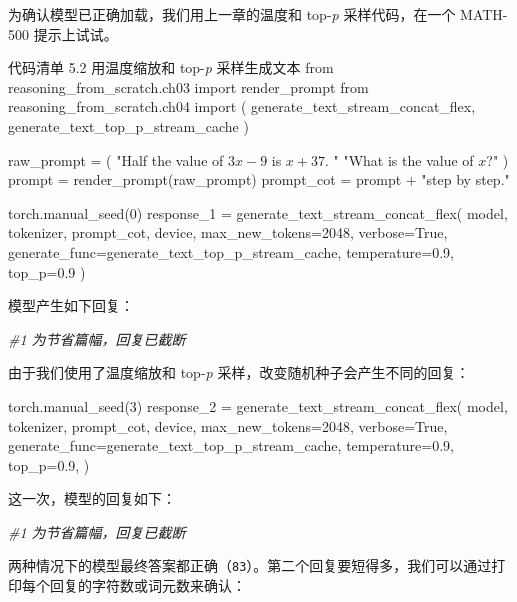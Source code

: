 为确认模型已正确加载，我们用上一章的温度和 top-\emph{p} 采样代码，在一个 MATH-500 提示上试试。

\begin{codeboxt}{代码清单 5.2 用温度缩放和 top-\emph{p} 采样生成文本}
from reasoning_from_scratch.ch03 import render_prompt
from reasoning_from_scratch.ch04 import (
    generate_text_stream_concat_flex,
    generate_text_top_p_stream_cache
)

raw_prompt = (
    "Half the value of $3x-9$ is $x+37$. "
    "What is the value of $x$?"
)
prompt = render_prompt(raw_prompt)
prompt_cot = prompt + "\n\nExplain step by step."

torch.manual_seed(0)
response_1 = generate_text_stream_concat_flex(
    model, tokenizer, prompt_cot, device,
    max_new_tokens=2048, verbose=True,
    generate_func=generate_text_top_p_stream_cache,
    temperature=0.9,
    top_p=0.9
)
\end{codeboxt}

模型产生如下回复：

{\noindent\small\textit{\#1 为节省篇幅，回复已截断}\par}

由于我们使用了温度缩放和 top-\emph{p} 采样，改变随机种子会产生不同的回复：

\begin{codebox}
torch.manual_seed(3)
response_2 = generate_text_stream_concat_flex(
    model, tokenizer, prompt_cot, device,
    max_new_tokens=2048, verbose=True,
    generate_func=generate_text_top_p_stream_cache,
    temperature=0.9,
    top_p=0.9,
)
\end{codebox}

这一次，模型的回复如下：

{\noindent\small\textit{\#1 为节省篇幅，回复已截断}\par}

两种情况下的模型最终答案都正确（\texttt{83}）。第二个回复要短得多，我们可以通过打印每个回复的字符数或词元数来确认：

